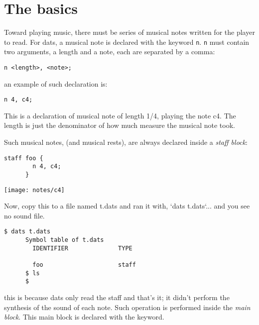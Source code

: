 \section{The basics}

\np Toward playing music, there must be series of musical notes written for the player to read.
For dats, a musical note is declared with the keyword \verb+n+. \verb+n+ must contain two arguments,
a length and a note, each are separated by a comma:


\begin{Verbatim}[frame=single]
       n <length>, <note>;
\end{Verbatim}


\np an example of such declaration is:
\begin{Verbatim}[frame=single]
       n 4, c4;
\end{Verbatim}

This is a declaration of musical note of length 1/4, playing the note c4. The length
is just the denominator of how much measure the musical note took.

\np Such musical notes, (and musical rests), are always declared inside a \textit{staff block}:

\begin{Verbatim}[frame=single]
      staff foo {
        n 4, c4;
      }
\end{Verbatim}

\begin{center}
\texttt{[image: notes/c4]}
\end{center}

\np Now, copy this to a file named t.dats and ran it with, `dats t.dats`... and you
see no sound file.

\begin{Verbatim}[frame=single]
      $ dats t.dats
      Symbol table of t.dats
        IDENTIFIER              TYPE
      
        foo                     staff
      $ ls
      $
\end{Verbatim}

this is because dats only read the staff and that's it; it didn't perform the synthesis of the
sound of each note. Such operation is performed inside the \textit{main block}. This main block
is declared with the  keyword.

